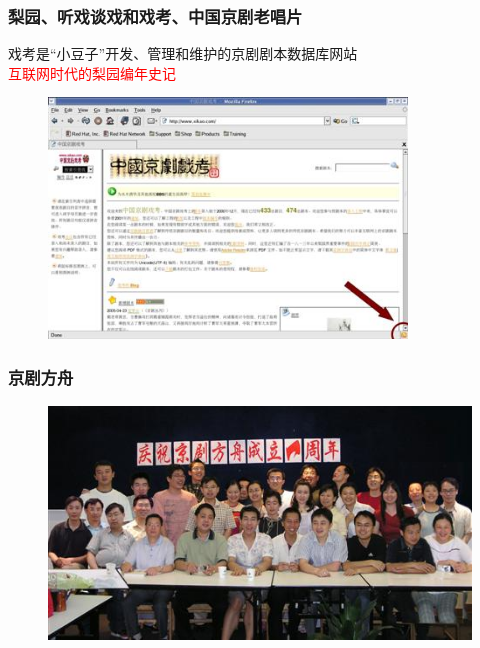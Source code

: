 \documentclass[cjk,slidestop,compress,mathserif,blue]{beamer}
\begin{document}
\frame
{
	\frametitle{梨园、听戏谈戏和戏考、中国京剧老唱片}
	戏考是“小豆子”开发、管理和维护的京剧剧本数据库网站\\
	\textcolor{red}{互联网时代的梨园编年史记}
\begin{figure}[h!]
\centering
\vspace{-0.05in}
\includegraphics[height=0.60\textwidth,width=0.85\textwidth,clip]{Figures/PekOpe_Xikao.jpg}
\label{Xikao}
\end{figure}
}

\frame
{
	\frametitle{京剧方舟}
\begin{figure}[h!]
\centering
\vspace{-0.1in}
\hspace*{-0.15in}
\includegraphics[height=0.60\textwidth,width=1.05\textwidth,clip]{Figures/PekOpe_Fangzhou.jpg}
\label{Fangzhou}
\end{figure}
}
\end{document}
